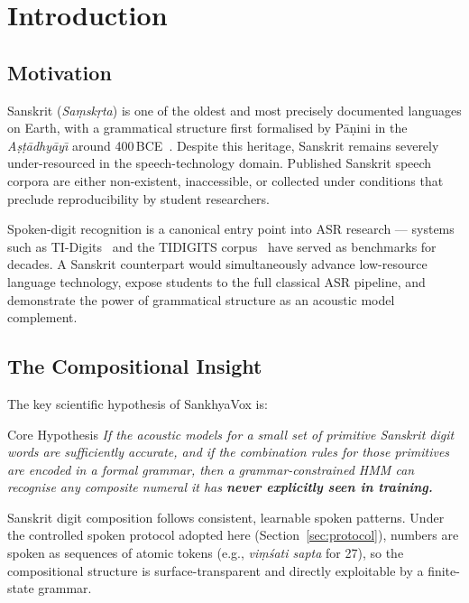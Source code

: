 \documentclass[12pt,a4paper]{article}
\begin{document}
\newpage

\section{Introduction}

\subsection{Motivation}

Sanskrit (\textit{Sa\d{m}sk\d{r}ta}) is one of the oldest and most precisely
documented languages on Earth, with a grammatical structure first formalised
by P\={a}\d{n}ini in the \textit{A\d{s}\d{t}\={a}dhy\={a}y\={\i}} around
400\,BCE~\cite{cardona1997panini}.
Despite this heritage, Sanskrit remains severely under-resourced in the
speech-technology domain.
Published Sanskrit speech corpora are either non-existent, inaccessible, or
collected under conditions that preclude reproducibility by student researchers.

Spoken-digit recognition is a canonical entry point into ASR research ---
systems such as TI-Digits~\cite{leonard1984tidigits} and the TIDIGITS
corpus~\cite{leonard1984tidigits2} have served as benchmarks for decades.
A Sanskrit counterpart would simultaneously advance low-resource language
technology, expose students to the full classical ASR pipeline, and
demonstrate the power of grammatical structure as an acoustic model complement.

\subsection{The Compositional Insight}

The key scientific hypothesis of SankhyaVox is:

\begin{keybox}{Core Hypothesis}
\textit{If the acoustic models for a small set of primitive Sanskrit digit
words are sufficiently accurate, and if the combination rules for those
primitives are encoded in a formal grammar, then a grammar-constrained
HMM can recognise any composite numeral it has \textbf{never explicitly seen
in training.}}
\end{keybox}

Sanskrit digit composition follows consistent, learnable spoken patterns.
Under the controlled spoken protocol adopted here (Section~\ref{sec:protocol}),
numbers are spoken as sequences of atomic tokens (e.g., \textit{vi\d{m}\'{s}ati sapta}
for 27), so the compositional structure is surface-transparent and directly
exploitable by a finite-state grammar.
\end{document}

